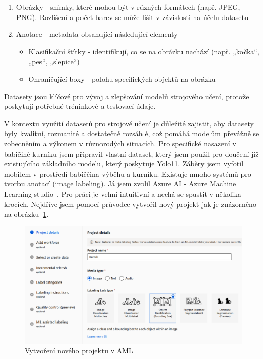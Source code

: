\begin{enumerate}
    \item Obrázky - snímky, které mohou být v různých formátech (např. JPEG, PNG). Rozlišení a počet barev se může lišit v závislosti na účelu datasetu
    \item Anotace - metadata obsahující následující elementy
    \begin{itemize}
        \item Klasifikační štítky - identifikují, co se na obrázku nachází (např. „kočka“, „pes“, „slepice“)
        \item Ohraničující boxy - polohu specifických objektů na obrázku
    \end{itemize}
\end{enumerate}

Datasety jsou klíčové pro vývoj a zlepšování modelů strojového učení, protože poskytují potřebné tréninkové a testovací údaje.

V kontextu využití datasetů pro strojové učení je důležité zajistit, aby datasety byly kvalitní, rozmanité a dostatečně rozsáhlé, což pomáhá modelům převážně se zobecněním a výkonem v různorodých situacích.
Pro specifické nasazení v babičině kurníku jsem připravil vlastní dataset, který jsem použil pro doučení již existujícího základního modelu, který poskytuje Yolo11.
Záběry jsem vyfotil mobilem v prostředí babiččina výběhu a kurníku.
Existuje mnoho systémů pro tvorbu anotací (image labeling).
Já jsem zvolil Azure AI - Azure Machine Learning studio~\cite{aml}.
Pro práci je velmi intuitivní a nechá se spustit v několika krocích.
Nejdříve jsem pomocí průvodce vytvořil nový projekt jak je znázorněno na obrázku~\ref{fig:create_learning_project}.

\begin{figure}[htbp]
    \centering
    \includegraphics[width=1.0\textwidth]{img/create_learning_project}
    \caption{Vytvoření nového projektu v AML}
    \label{fig:create_learning_project}
\end{figure}


